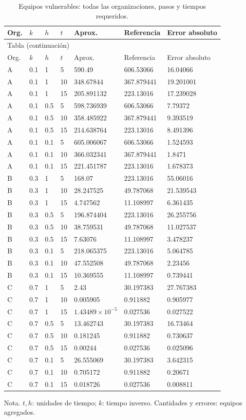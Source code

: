 \clearpage
\begingroup\small\setlength{\tabcolsep}{4pt}
\begin{longtable}{lllllll}
\caption{Equipos vulnerables: todas las organizaciones, pasos y tiempos requeridos.}\label{tab:vulnerabilidades}\\
\toprule
Org. & $k$ & $h$ & $t$ & Aprox. & Referencia & Error absoluto\\
\midrule\endfirsthead
\multicolumn{7}{l}{\small Tabla \thetable{} (continuación)}\\
\toprule
Org. & $k$ & $h$ & $t$ & Aprox. & Referencia & Error absoluto\\
\midrule\endhead
\bottomrule\endfoot
A & 0.1 & 1 & 5 & 590.49 & 606.53066 & 16.04066\\
A & 0.1 & 1 & 10 & 348.67844 & 367.879441 & 19.201001\\
A & 0.1 & 1 & 15 & 205.891132 & 223.13016 & 17.239028\\
A & 0.1 & 0.5 & 5 & 598.736939 & 606.53066 & 7.79372\\
A & 0.1 & 0.5 & 10 & 358.485922 & 367.879441 & 9.393519\\
A & 0.1 & 0.5 & 15 & 214.638764 & 223.13016 & 8.491396\\
A & 0.1 & 0.1 & 5 & 605.006067 & 606.53066 & 1.524593\\
A & 0.1 & 0.1 & 10 & 366.032341 & 367.879441 & 1.8471\\
A & 0.1 & 0.1 & 15 & 221.451787 & 223.13016 & 1.678373\\
B & 0.3 & 1 & 5 & 168.07 & 223.13016 & 55.06016\\
B & 0.3 & 1 & 10 & 28.247525 & 49.787068 & 21.539543\\
B & 0.3 & 1 & 15 & 4.747562 & 11.108997 & 6.361435\\
B & 0.3 & 0.5 & 5 & 196.874404 & 223.13016 & 26.255756\\
B & 0.3 & 0.5 & 10 & 38.759531 & 49.787068 & 11.027537\\
B & 0.3 & 0.5 & 15 & 7.63076 & 11.108997 & 3.478237\\
B & 0.3 & 0.1 & 5 & 218.065375 & 223.13016 & 5.064785\\
B & 0.3 & 0.1 & 10 & 47.552508 & 49.787068 & 2.23456\\
B & 0.3 & 0.1 & 15 & 10.369555 & 11.108997 & 0.739441\\
C & 0.7 & 1 & 5 & 2.43 & 30.197383 & 27.767383\\
C & 0.7 & 1 & 10 & 0.005905 & 0.911882 & 0.905977\\
C & 0.7 & 1 & 15 & $1.43489\times 10^{-5}$ & 0.027536 & 0.027522\\
C & 0.7 & 0.5 & 5 & 13.462743 & 30.197383 & 16.73464\\
C & 0.7 & 0.5 & 10 & 0.181245 & 0.911882 & 0.730637\\
C & 0.7 & 0.5 & 15 & 0.00244 & 0.027536 & 0.025096\\
C & 0.7 & 0.1 & 5 & 26.555069 & 30.197383 & 3.642315\\
C & 0.7 & 0.1 & 10 & 0.705172 & 0.911882 & 0.20671\\
C & 0.7 & 0.1 & 15 & 0.018726 & 0.027536 & 0.008811\\
\end{longtable}
\endgroup
{\footnotesize Nota. $t,h$: unidades de tiempo; $k$: tiempo inverso. Cantidades y errores: equipos agregados.}
